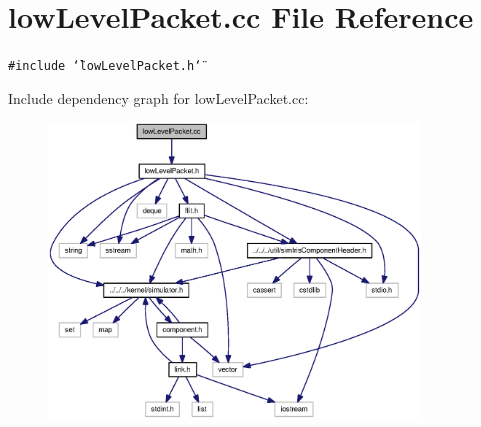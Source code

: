 \section{lowLevelPacket.cc File Reference}
\label{lowLevelPacket_8cc}
{\tt \#include \char`\"{}lowLevelPacket.h\char`\"{}}\par


Include dependency graph for lowLevelPacket.cc:\nopagebreak
\begin{figure}[H]
\begin{center}
\leavevmode
\includegraphics[width=280pt]{lowLevelPacket_8cc__incl}
\end{center}
\end{figure}
